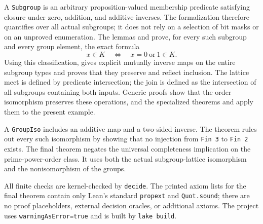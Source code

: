 \documentclass[10pt]{article}
\begin{document}
A \texttt{Subgroup} is an arbitrary proposition-valued membership predicate satisfying closure under zero, addition, and additive inverses. The formalization therefore quantifies over all actual subgroups; it does not rely on a selection of bit masks or on an unproved enumeration. The lemmas  and  prove, for every such subgroup and every group element, the exact formula
\[
 x\in K\quad\Longleftrightarrow\quad x=0\ \text{or}\ 1\in K.
\]
Using this classification,  gives explicit mutually inverse maps on the entire subgroup types and proves that they preserve and reflect inclusion. The lattice meet is defined by predicate intersection; the join is defined as the intersection of all subgroups containing both inputs. Generic proofs show that the order isomorphism preserves these operations, and the specialized theorems  and  apply them to the present example.

A \texttt{GroupIso} includes an additive map and a two-sided inverse. The theorem  rules out every such isomorphism by showing that no injection from \texttt{Fin 3} to \texttt{Fin 2} exists. The final theorem  negates the universal completeness implication on the prime-power-order class. It uses both the actual subgroup-lattice isomorphism and the nonisomorphism of the groups.

All finite checks are kernel-checked by \texttt{decide}. The printed axiom lists for the final theorem contain only Lean's standard \texttt{propext} and \texttt{Quot.sound}; there are no proof placeholders, external decision oracles, or additional axioms. The project uses \texttt{warningAsError=true} and is built by \texttt{lake build}.
\end{document}

